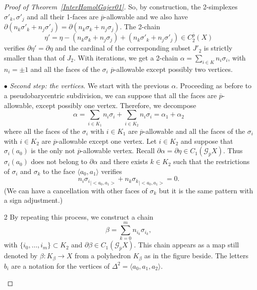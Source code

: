 \documentclass[a4paper,10pt,english,reqno]{amsart}
\theoremstyle{plain}
\theoremstyle{definition}
\theoremstyle{remark}
\numberwithin{equation}{section}
\newcommand{\thmref}[1]{Theorem~\ref{#1}}
\def\ov{\overline}
\def\crG{{\mathscr G}}
\renewcommand\1{\hbox{\ding{192}}}
\renewcommand\2{\hbox{\ding{193}}}
\newcommand\3{\hbox{\ding{194}}}
\newcommand\4{\hbox{\ding{195}}}
\begin{document}
\begin{proof}[Proof of \thmref{InterHomolGajer01}]
{
}

\noindent So, by construction, the 2-simplexes $\sigma'_k,\sigma'_j$ and all their 1-faces are $\ov p$-allowable
%
and we also have 
$\partial (n_k \sigma'_k +n_j\sigma'_j )= \partial (n_k \sigma_k +n_j\sigma_j)$.
The 2-chain 
$$
\eta' = \eta - (n_k \sigma_k +n_j\sigma_j ) + (n_k \sigma'_k +n_j\sigma'_j) \in C_2^{\ov p}(X)
$$
 verifies $\partial \eta'  = \partial \eta$ and the cardinal of the corresponding subset $J'_{2}$ is strictly smaller than that  of $J_{2}$.
 With iterations, we get a 2-chain $\alpha=\sum_{i\in K}n_{i}\sigma_{i}$, with $n_{i}=\pm 1$ and all the faces of the $\sigma_{i}$ $\ov{p}$-allowable except possibly two vertices.
 
 
  \medskip
$\bullet$ \emph{Second step: the vertices}. 
We start with the previous $\alpha$. 
%
%
%
Proceeding as before  to a pseudobarycentric subdivision, we can suppose that all the faces are $\ov{p}$-allowable, except possibly one vertex.
%
%
%
Therefore, we decompose
$$
 \alpha= \sum_{i\in K_{1}} n_i \sigma_i +  
\sum_{i\in K_{2}} n_i \sigma_i=\alpha_{1}+\alpha_{2}
$$
 where 
 all the faces of the $\sigma_{i}$ with $i\in K_{1}$ are $\ov{p}$-allowable and all the faces of the 
 $\sigma_{i}$ with $i\in K_{2}$ are $\ov{p}$-allowable except one vertex.
% 
 Let  $i\in K_{2}$ and  suppose that $\sigma_{i}(a_{0})$ is the only not $\ov p$-allowable vertex.
Recall $\partial\alpha=\partial\eta\in    C_1(\crG_{\ov p} X )$. Thus $\sigma_{i}(a_{0})$ does not belong to $\partial \alpha$ and
there exists  $k \in K_{2}$ such that the restrictions of $\sigma_{i}$ and $\sigma_{k}$ to the face $\langle a_{0},a_{1}\rangle$ verifies
 $$n_{i} {\sigma_{i}}_{|<a_0,a_1>} + n_{k} {\sigma_{k}}_{|<a_0,a_1>}=0.$$
(We can have a cancellation with other faces of $\sigma_{k}$ but it is the same pattern with a sign adjustment.)

\begin{multicols}{2}
By repeating this  process, we construct a chain 
\begin{equation}\label{beta}
\beta = \sum_{k=0}^m n_{i_k} \sigma_{i_k} ,
\end{equation}
with $\{i_0, \ldots,i_m\} \subset K_{2}$ and $\partial \beta \in C_1(\crG_{\ov p}X)$.
This chain appears as a map still denoted by $\beta\colon K_{\beta}\to X$ from a polyhedron $K_{\beta}$ as in the figure beside. 
The letters $b_{i}$ are a notation for the vertices of $\Delta^2=\langle a_{0},a_{1},a_{2}\rangle$.


\end{multicols}
\end{proof}
\end{document}
